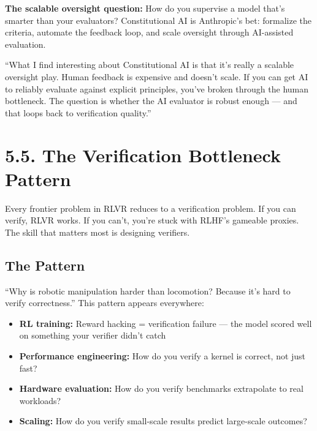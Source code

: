 \textbf{The scalable oversight question:} How do you supervise a model that's smarter than your evaluators? Constitutional AI is Anthropic's bet: formalize the criteria, automate the feedback loop, and scale oversight through AI-assisted evaluation.

\begin{sayit}[Constitutional AI]
``What I find interesting about Constitutional AI is that it's really a scalable oversight play. Human feedback is expensive and doesn't scale. If you can get AI to reliably evaluate against explicit principles, you've broken through the human bottleneck. The question is whether the AI evaluator is robust enough --- and that loops back to verification quality.''
\end{sayit}

\section{5.5. The Verification Bottleneck Pattern}

\begin{bluf}
Every frontier problem in RLVR reduces to a verification problem. If you can verify, RLVR works. If you can't, you're stuck with RLHF's gameable proxies. The skill that matters most is designing verifiers.
\end{bluf}

\subsection{The Pattern}

``Why is robotic manipulation harder than locomotion? Because it's hard to verify correctness.'' This pattern appears everywhere:

\begin{itemize}
  \item \textbf{RL training:} Reward hacking = verification failure --- the model scored well on something your verifier didn't catch
  \item \textbf{Performance engineering:} How do you verify a kernel is correct, not just fast?
  \item \textbf{Hardware evaluation:} How do you verify benchmarks extrapolate to real workloads?
  \item \textbf{Scaling:} How do you verify small-scale results predict large-scale outcomes?
\end{itemize}

